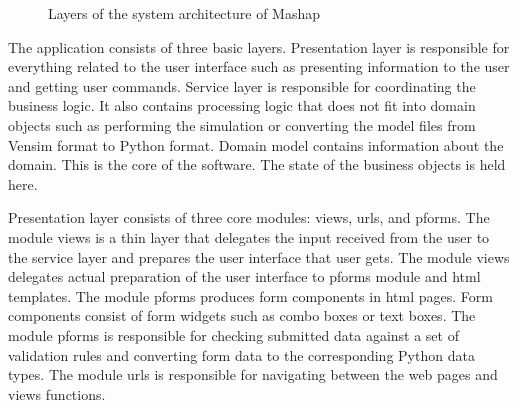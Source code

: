 \documentclass[12pt,a4paper]{paper}
\begin{document}
\begin{figure}
	\centering
\caption{Layers of the system architecture of Mashap}%
\label{fig:layers}%
\end{figure}

The application consists of three basic layers. Presentation layer is responsible for everything related to the user interface such as presenting information to the user and getting user commands. Service layer is responsible for coordinating the business logic. It also contains processing logic that does not fit into domain objects such as performing the simulation or converting the model files from Vensim format to Python format. Domain model contains information about the domain. This is the core of the software. The state of the business objects is held here.

Presentation layer consists of three core modules: views, urls, and pforms. The module views is a thin layer that delegates the input received from the user to the service layer and prepares the user interface that user gets. The module views delegates actual preparation of the user interface to pforms module and html templates. The module pforms produces form components in html pages. Form components consist of form widgets such as combo boxes or text boxes. The module pforms is responsible for checking submitted data against a set of validation rules and converting form data to the corresponding Python data types. The module urls is responsible for navigating between the web pages and views functions.
\end{document}
